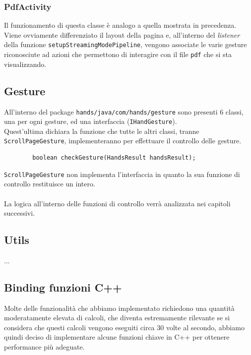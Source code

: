 \subsubsection{PdfActivity}
Il funzionamento di questa classe è analogo a quella mostrata in precedenza. Viene ovviamente differenziato il layout della pagina e, all'interno del \textit{listener} della funzione \texttt{setupStreamingModePipeline}, vengono associate le varie gesture riconosciute ad azioni che permettono di interagire con il file \texttt{pdf} che si sta visualizzando.


\subsection{Gesture}
All'interno del package \texttt{hands/java/com/hands/gesture} sono presenti 6 classi, una per ogni gesture, ed una interfaccia (\texttt{IHandGesture}).\\
Quest'ultima dichiara la funzione che tutte le altri classi, tranne \texttt{ScrollPageGesture}, implementeranno per effettuare il controllo delle gesture.
\begin{center}
    \begin{verbatim}
        boolean checkGesture(HandsResult handsResult);
    \end{verbatim}
\end{center}
\noindent \texttt{ScrollPageGesture} non implementa l'interfaccia in quanto la sua funzione di controllo restituisce un intero.\\
\\
\noindent La logica all'interno delle funzioni di controllo verrà analizzata nei capitoli successivi.

\subsection{Utils}
...

\subsection{Binding funzioni C++}
\noindent
Molte delle funzionalità che abbiamo implementato richiedono una quantità moderatamente elevata di calcoli, che diventa estremamente rilevante se si considera che questi calcoli vengono eseguiti circa 30 volte al secondo, abbiamo quindi deciso di implementare alcune funzioni chiave in C++ per ottenere performance più adeguate.\\

